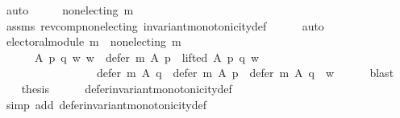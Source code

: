 \begin{isabellebody}
\ auto\isanewline
\ \ \isamarkupfalse%
\ \isamarkupfalse%
\ {\isachardoublequoteopen}non{\isacharunderscore}{\kern0pt}electing\ {\isacharparenleft}{\kern0pt}m{\isasymdown}{\isacharparenright}{\kern0pt}{\isachardoublequoteclose}\isanewline
\ \ \ \ \isamarkupfalse%
\ assms\ rev{\isacharunderscore}{\kern0pt}comp{\isacharunderscore}{\kern0pt}non{\isacharunderscore}{\kern0pt}electing\ invariant{\isacharunderscore}{\kern0pt}monotonicity{\isacharunderscore}{\kern0pt}def\isanewline
\ \ \ \ \isamarkupfalse%
\ auto\isanewline
\ \ \isamarkupfalse%
\ \isamarkupfalse%
\ {\isachardoublequoteopen}electoral{\isacharunderscore}{\kern0pt}module\ {\isacharparenleft}{\kern0pt}m{\isasymdown}{\isacharparenright}{\kern0pt}\ {\isasymand}\ non{\isacharunderscore}{\kern0pt}electing\ {\isacharparenleft}{\kern0pt}m{\isasymdown}{\isacharparenright}{\kern0pt}\ {\isasymand}\isanewline
\ \ \ \ \ \ {\isacharparenleft}{\kern0pt}{\isasymforall}A\ p\ q\ w{\isachardot}{\kern0pt}\ {\isacharparenleft}{\kern0pt}w\ {\isasymin}\ defer\ {\isacharparenleft}{\kern0pt}m{\isasymdown}{\isacharparenright}{\kern0pt}\ A\ p\ {\isasymand}\ lifted\ A\ p\ q\ w{\isacharparenright}{\kern0pt}\ {\isasymlongrightarrow}\isanewline
\ \ \ \ \ \ \ \ \ \ \ \ \ \ \ \ \ {\isacharparenleft}{\kern0pt}defer\ {\isacharparenleft}{\kern0pt}m{\isasymdown}{\isacharparenright}{\kern0pt}\ A\ q\ {\isacharequal}{\kern0pt}\ defer\ {\isacharparenleft}{\kern0pt}m{\isasymdown}{\isacharparenright}{\kern0pt}\ A\ p\ {\isasymor}\ defer\ {\isacharparenleft}{\kern0pt}m{\isasymdown}{\isacharparenright}{\kern0pt}\ A\ q\ {\isacharequal}{\kern0pt}\ {\isacharbraceleft}{\kern0pt}w{\isacharbraceright}{\kern0pt}{\isacharparenright}{\kern0pt}{\isacharparenright}{\kern0pt}{\isachardoublequoteclose}\isanewline
\ \ \ \ \isamarkupfalse%
\ blast\isanewline
\ \ \isamarkupfalse%
\ {\isacharquery}{\kern0pt}thesis\isanewline
\ \ \ \ \isamarkupfalse%
\ defer{\isacharunderscore}{\kern0pt}invariant{\isacharunderscore}{\kern0pt}monotonicity{\isacharunderscore}{\kern0pt}def\isanewline
\ \ \ \ \isamarkupfalse%
\ {\isacharparenleft}{\kern0pt}simp\ add{\isacharcolon}{\kern0pt}\ defer{\isacharunderscore}{\kern0pt}invariant{\isacharunderscore}{\kern0pt}monotonicity{\isacharunderscore}{\kern0pt}def{\isacharparenright}{\kern0pt}\isanewline
{}\isamarkupfalse%
%
\endisatagproof
{\isafoldproof}%
%
\isadelimproof
\isanewline
%
\endisadelimproof
\isanewline
\isanewline
{}\isamarkupfalse%

\end{isabellebody}
